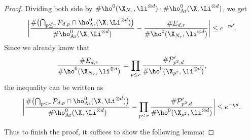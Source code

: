 \begin{proof}
Dividing both side by $\#\ho^0(\X_{N_r}, \li^{\otimes d})\cdot\#\ho^0_{\mathrm{Ar}}(\X, \Li^{\otimes d})$, we get
\[
\biggl| \frac{\#\bigl(\bigcap_{p\leq r}\mathcal{P}_{d,p}\cap \ho^0_{\mathrm{Ar}}(\X, \Li^{\otimes d})\bigr)}{\#\ho^0_{\mathrm{Ar}}(\X, \Li^{\otimes d})} -\frac{\#E_{d,r}}{\#\ho^0(\X_{N_r}, \li^{\otimes d})} \biggr|\leq e^{-\eta d}.
\]
Since we already know that
\[
\frac{\#E_{d,r}}{\#\ho^0(\X_{N_r}, \li^{\otimes d})}=\prod_{p\leq r} \frac{\#\mathcal{P}'_{p^2,d}}{\#\ho^0(\X_{p^2}, \li^{\otimes d})},
\]
the inequality can be written as
\[
\biggl| \frac{\#\bigl(\bigcap_{p\leq r}\mathcal{P}_{d,p}\cap \ho^0_{\mathrm{Ar}}(\X, \Li^{\otimes d})\bigr)}{\#\ho^0_{\mathrm{Ar}}(\X, \Li^{\otimes d})} -\prod_{p\leq r} \frac{\#\mathcal{P}'_{p^2,d}}{\#\ho^0(\X_{p^2}, \li^{\otimes d})} \biggr|\leq e^{-\eta d}.
\]

Thus to finish the proof, it suffices to show the following lemma:


\end{proof}
